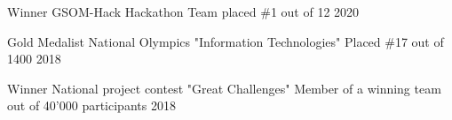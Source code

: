 

\begin{cvhonors}
  \cvhonor
  {Winner} %
  {GSOM-Hack Hackathon} %
  {Team placed \#1 out of 12} %
  {2020} %

  \cvhonor
  {Gold Medalist} %
  {National Olympics "Information Technologies"} %
  {Placed \#17 out of 1400} %
  {2018} %

  \cvhonor
  {Winner} %
  {National project contest "Great Challenges"} %
  {Member of a winning team out of 40'000 participants} %
  {2018} %

\end{cvhonors}
